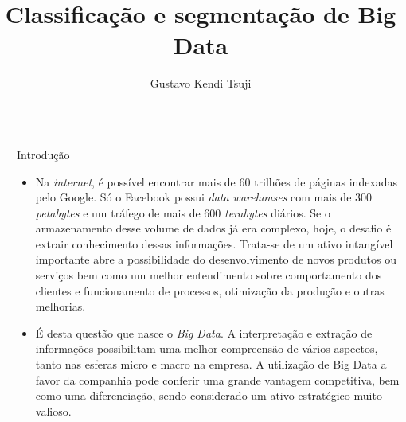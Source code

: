 \documentclass[final,hyperref={pdfpagelabels=false}]{beamer}
\title{\huge Classifica\c c\~ao e segmenta\c c\~ao de Big Data} %
\author{Gustavo Kendi Tsuji} %
\institute{Faculdade de Administra\c c\~ao, Economia e Contabilidade} %
\begin{document}

\begin{frame}[t] %

\begin{columns}[t] %

\begin{column}{.02\textwidth}\end{column} %

\begin{column}{.465\textwidth} %

            
\begin{block}{Introdu\c c\~ao}

\begin{itemize}

\item Na \emph{internet}, é possível encontrar mais de 60 trilhões de páginas indexadas pelo Google. Só o Facebook possui \emph{data warehouses} com mais de 300 \emph{petabytes} e um tráfego de mais de 600 \emph{terabytes} diários. Se o armazenamento desse volume de dados já era complexo, hoje, o desafio é extrair conhecimento dessas informações. Trata-se de um ativo intangível importante abre a possibilidade do desenvolvimento de novos produtos ou serviços bem como um melhor entendimento sobre comportamento dos clientes e funcionamento de processos, otimização da produção e outras melhorias.

\item É desta questão que nasce o \emph{Big Data}. A interpretação e extração de informações possibilitam uma melhor compreensão de vários aspectos, tanto nas esferas micro e macro na empresa. A utilização de \alert{Big Data} a favor da companhia pode conferir uma grande vantagem competitiva, bem como uma diferenciação, sendo considerado um ativo estratégico muito valioso.

\end{itemize}


\end{block}
\end{column}
\end{columns}
\end{frame}
\end{document}
